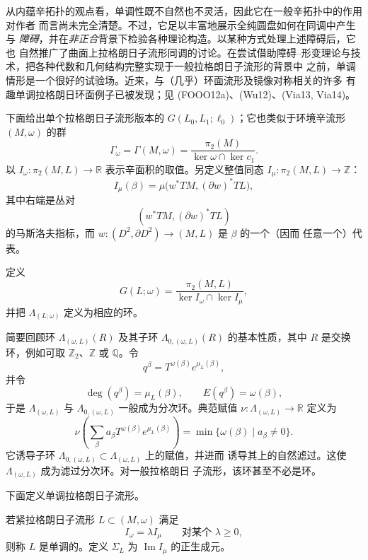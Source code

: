 \begin{remark}
\label{rem:role-of-monotonicity}
从内蕴辛拓扑的观点看，单调性既不自然也不灵活，因此它在一般辛拓扑中的作用对作者
而言尚未完全清楚。不过，它足以丰富地展示全纯圆盘如何在\personFloer{}同调中产生\emph{\termAnomaly{}}与
\emph{障碍}，并在\emph{非正合}背景下检验各种\personFloer{}理论构造。以某种方式处理上述障碍后，它也
自然推广了曲面上拉格朗日子流形\personFloer{}同调的讨论。在尝试借助障碍--形变理论与\termKuranishiStructure{}技术，把各种代数和几何结构完整实现于一般拉格朗日子流形的背景中
之前，单调情形是一个很好的试验场。近来，与（几乎）环面流形及镜像对称相关的许多
有趣单调拉格朗日环面例子已被发现；见 (FOOO12a)、(Wu12)、(Via13, Via14)。
\end{remark}

下面给出单个拉格朗日子流形版本的 $G(L_0,L_1;\ell_0)$；它也类似于环境辛流形
$(M,\omega)$ 的群
\[
 \Gamma_\omega=\Gamma(M,\omega)
 =\frac{\pi_2(M)}{\ker\omega\cap\ker c_1}.
\]
以 $I_\omega:\pi_2(M,L)\to\mathbb R$ 表示辛面积的取值。另定义整值同态
$I_\mu:\pi_2(M,L)\to\mathbb Z$：
\[
 I_\mu(\beta)=\mu\bigl(w^*TM,(\partial w)^*TL\bigr),
\]
其中右端是丛对
\[
 (w^*TM,(\partial w)^*TL)
\]
的马斯洛夫指标，而 $w:(D^2,\partial D^2)\to(M,L)$ 是 $\beta$ 的一个（因而
任意一个）代表。

\begin{definition}
\label{def:lagrangian-novikov-group}
定义
\[
 G(L;\omega)=\frac{\pi_2(M,L)}{\ker I_\omega\cap\ker I_\mu},
\]
并把 $\Lambda_{(L;\omega)}$ 定义为相应的\personNovikov{}环。
\end{definition}

简要回顾\personNovikov{}环 $\Lambda_{(\omega,L)}(R)$ 及其子环
$\Lambda_{0,(\omega,L)}(R)$ 的基本性质，其中 $R$ 是交换环，例如可取
$\mathbb Z_2$、$\mathbb Z$ 或 $\mathbb Q$。令
\[
 q^\beta=T^{\omega(\beta)}e^{\mu_L(\beta)},
\]
并令
\[
 \deg(q^\beta)=\mu_L(\beta),\qquad E(q^\beta)=\omega(\beta),
\]
于是 $\Lambda_{(\omega,L)}$ 与 $\Lambda_{0,(\omega,L)}$ 一般成为分次环。典范赋值
$\nu:\Lambda_{(\omega,L)}\to\mathbb R$ 定义为
\[
 \nu\left(\sum_\beta a_\beta T^{\omega(\beta)}e^{\mu_L(\beta)}\right)
 =\min\{\omega(\beta)\mid a_\beta\neq0\}.
\]
它诱导子环 $\Lambda_{0,(\omega,L)}\subset\Lambda_{(\omega,L)}$ 上的赋值，并进而
诱导其上的自然滤过。这使 $\Lambda_{(\omega,L)}$ 成为滤过分次环。对一般拉格朗日
子流形，该环甚至不必是\personNoether{}环。

下面定义单调拉格朗日子流形。

\begin{definition}
\label{def:monotone-lagrangian}
若紧拉格朗日子流形 $L\subset(M,\omega)$ 满足
\[
 I_\omega=\lambda I_\mu\qquad\text{对某个 }\lambda\geq0,
\]
则称 $L$ 是单调的。定义\emph{\termMinimalMaslovNumber{}} $\Sigma_L$ 为
$\operatorname{Im}I_\mu$ 的正生成元。
\end{definition}

